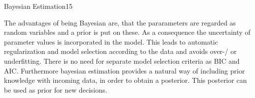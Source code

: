 \begin{questions}
\begin{question}[bonus]{Bayesian Estimation}{15}
\begin{answer}
The advantages of being Bayesian are, that the pararameters are regarded as random variables and a prior is put on these. As a consequence the uncertainty of parameter values is incorporated in the model. This leads to automatic regularization and model selection according to the data and avoids over-/ or underfitting. There is no need for separate model selection criteria as BIC and AIC. Furthermore bayesian estimation provides a natural way of  including prior knowledge with incoming data, in order to obtain a posterior. This posterior can be used as prior for new decisions.
\end{answer}

\end{question}

\end{questions}
